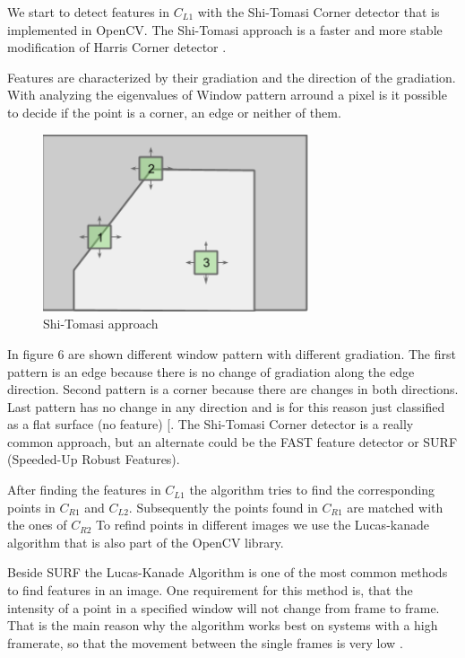 \documentclass[11pt]{article}
\begin{document}
	We start to detect features in $C_{L1}$ with the Shi-Tomasi Corner detector that is implemented in OpenCV. The Shi-Tomasi approach is a faster and more stable modification of Harris Corner detector \cite{Shi-Tomasi_Wiki}. 

	Features are characterized by their gradiation and the direction of the gradiation. With analyzing the eigenvalues of Window pattern arround a pixel is it possible to decide if the point is a corner, an edge or neither of them. 
	
	\begin{figure}[H]
		\centering
		\includegraphics[width=0.7\textwidth]{images/tomasi.png}
		\caption{Shi-Tomasi approach}
	\end{figure}
	
	In figure 6 are shown different window pattern with different gradiation. The first pattern is an edge because there is no change of gradiation along the edge direction. Second pattern is a corner because there are changes in both directions. Last pattern has no change in any direction and is for this reason just classified as a flat surface (no feature) [\cite{Shi-Tomasi, FeatureDetection}. The Shi-Tomasi Corner detector is a really common approach, but an alternate could be the FAST feature detector or SURF (Speeded-Up Robust Features). 

	After finding the features in $C_{L1}$ the algorithm tries to find the corresponding points in $C_{R1}$ and $C_{L2}$. Subsequently the points found in $C_{R1}$ are matched with the ones of $C_{R2}$
	To refind points in different images we use the Lucas-kanade algorithm that is also part of the OpenCV library.

	Beside SURF the Lucas-Kanade Algorithm is one of the most common methods to find features in an image. One requirement for this method is, that the intensity of a point in a specified window will not change from frame to frame. That is the main reason why the algorithm works best on systems with a high framerate, so that the movement between the single frames is very low \cite{Lucas_Kanade}.
\end{document}
